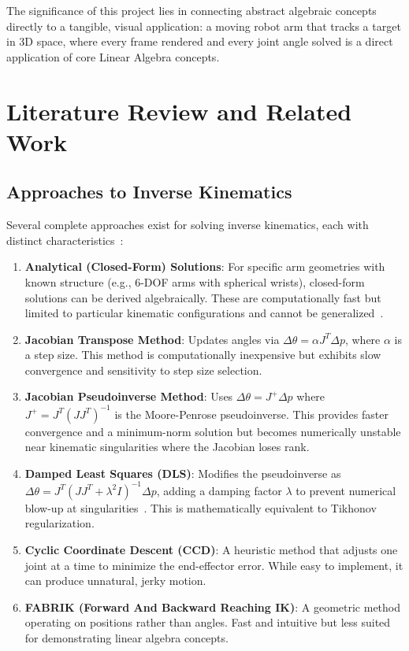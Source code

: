 \documentclass[11pt]{article}
\begin{document}
The significance of this project lies in connecting abstract algebraic concepts directly to a tangible, visual application: a moving robot arm that tracks a target in 3D space, where every frame rendered and every joint angle solved is a direct application of core Linear Algebra concepts.

\section{Literature Review and Related Work}

\subsection{Approaches to Inverse Kinematics}

Several complete approaches exist for solving inverse kinematics, each with distinct characteristics~\cite{buss2004, murray}:

\begin{enumerate}[nosep]
    \item \textbf{Analytical (Closed-Form) Solutions}: For specific arm geometries with known structure (e.g., 6-DOF arms with spherical wrists), closed-form solutions can be derived algebraically. These are computationally fast but limited to particular kinematic configurations and cannot be generalized~\cite{murray}.

    \item \textbf{Jacobian Transpose Method}: Updates angles via $\Delta\theta = \alpha J^T \Delta p$, where $\alpha$ is a step size. This method is computationally inexpensive but exhibits slow convergence and sensitivity to step size selection.

    \item \textbf{Jacobian Pseudoinverse Method}: Uses $\Delta\theta = J^+ \Delta p$ where $J^+ = J^T(JJ^T)^{-1}$ is the Moore-Penrose pseudoinverse. This provides faster convergence and a minimum-norm solution but becomes numerically unstable near kinematic singularities where the Jacobian loses rank.

    \item \textbf{Damped Least Squares (DLS)}: Modifies the pseudoinverse as $\Delta\theta = J^T(JJ^T + \lambda^2 I)^{-1}\Delta p$, adding a damping factor $\lambda$ to prevent numerical blow-up at singularities~\cite{buss2004}. This is mathematically equivalent to Tikhonov regularization.

    \item \textbf{Cyclic Coordinate Descent (CCD)}: A heuristic method that adjusts one joint at a time to minimize the end-effector error. While easy to implement, it can produce unnatural, jerky motion.

    \item \textbf{FABRIK (Forward And Backward Reaching IK)}: A geometric method operating on positions rather than angles. Fast and intuitive but less suited for demonstrating linear algebra concepts.
\end{enumerate}
\end{document}

